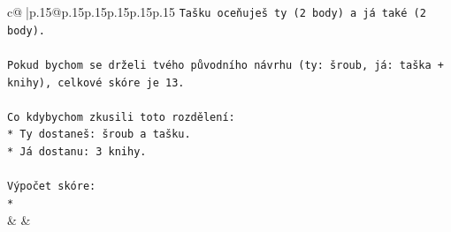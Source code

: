 \documentclass{article}
\begin{document}
{\begin{supertabular}{c@{$\;$}|p{.15\linewidth}@{}p{.15\linewidth}p{.15\linewidth}p{.15\linewidth}p{.15\linewidth}p{.15\linewidth}}
{{{\texttt{Tašku oceňuješ ty (2 body) a já také (2 body).} \\
\\ 
\texttt{Pokud bychom se drželi tvého původního návrhu (ty: šroub, já: taška + knihy), celkové skóre je 13.} \\
\\ 
\texttt{Co kdybychom zkusili toto rozdělení:} \\
\texttt{*   Ty dostaneš: šroub a tašku.} \\
\texttt{*   Já dostanu: 3 knihy.} \\
\\ 
\texttt{Výpočet skóre:} \\
\texttt{*} \\
            }
        }
    }
    & & \\ \\


\end{supertabular}}
\end{document}
